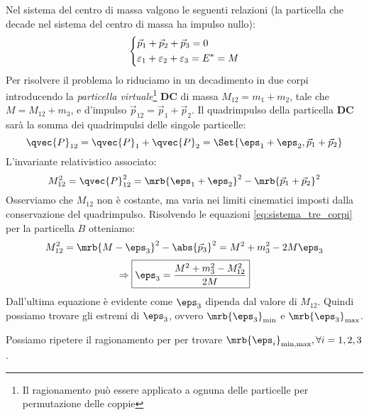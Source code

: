 Nel sistema del centro di massa valgono le seguenti relazioni (la particella
che decade nel sistema del centro di massa ha impulso nullo):
\begin{equation}
	\begin{dcases}
		\vec{p}_1 + \vec{p}_2 + \vec{p}_3 = 0
		\\
		\varepsilon_1 + \varepsilon_2 + \varepsilon_3 = E ^{\ast} = M
	\end{dcases}
	\label{eq:sistema_tre_corpi}
\end{equation}
Per risolvere il problema lo riduciamo in un decadimento in due corpi
introducendo la \textit{particella virtuale}\footnote{
	Il ragionamento può essere applicato a ognuna delle particelle per
	permutazione delle coppie
} $\boldsymbol{DC}$ di massa $M_{12} = m_1 + m_2$, tale che
$M = M _{12} + m_3$, e d'impulso $\vec{p}_{12} = \vec{p}_1 + \vec{p}_2$.
Il quadrimpulso della particella $\boldsymbol{DC}$ sarà la somma dei
quadrimpulsi delle singole particelle:
\begin{equation}
	\qvec{P}_{12}
	= \qvec{P}_1 + \qvec{P}_2
	= \Set{\eps_1 + \eps_2, \vec{p}_1 + \vec{p}_2}
\end{equation}
L'invariante relativistico associato:
\begin{equation}
	M_{12}^2 = \qvec{P}_{12}^2 = \mrb{\eps_1 + \eps_2}^2 -
	\mrb{\vec{p}_1 + \vec{p}_2}^2
\end{equation}
Osserviamo che $M_{12}$ non è costante, ma varia nei limiti cinematici imposti
dalla conservazione del quadrimpulso.
Risolvendo le equazioni \ref{eq:sistema_tre_corpi} per la particella $B$
otteniamo:
\begin{equation}
	M_{12}^2
	= \mrb{M - \eps_3}^2 - \abs{\vec{p}_3}^2
	= M^2 + m_3^2 - 2 M \eps_3
\end{equation}
\begin{equation}
	\Rightarrow \boxed{
		\eps_3 = \frac{M^2 + m_3^2 - M_{12}^2}{2 M}
	}
	\label{eq:epsilon_tre}
\end{equation}
Dall'ultima equazione è evidente come $\eps_3$ dipenda dal valore di
$M_{12}$. Quindi possiamo trovare gli estremi di $\eps_3$, ovvero
$\mrb{\eps_3}_{\text{min}}$ e $\mrb{\eps_3}_{\text{max}}$.

\begin{note}[]
	Possiamo ripetere il ragionamento per per trovare
	$\mrb{\eps_i}_{\text{min,max}}, \forall i = 1, 2, 3$.
\end{note}


